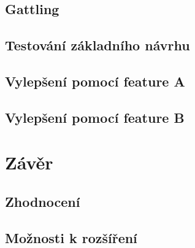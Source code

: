 \documentclass[FM,DP]{tulthesis}
\begin{document}
\section{Gattling}

\section{Testování základního návrhu}

\section{Vylepšení pomocí feature A}

\section{Vylepšení pomocí feature B}

\chapter{Závěr}

\section{Zhodnocení}

\section{Možnosti k rozšíření}
	
\begin{thebibliography}{Per00}

\end{thebibliography}
\end{document}

